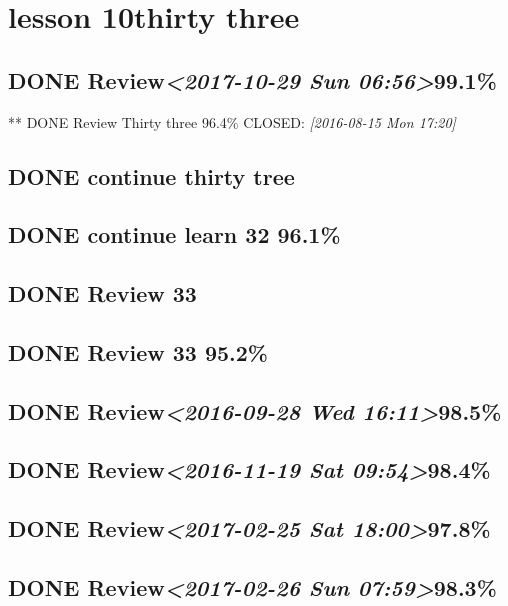 \documentclass[11pt]{ctexart}
\begin{document}
\section{lesson 10thirty three}
\label{sec:orgcbf88a8}
\subsection{{\bfseries\sffamily DONE} Review\textit{<2017-10-29 Sun 06:56>}99.1\%}
\label{sec:org2684000}
** DONE Review Thirty three 96.4\%
CLOSED: \textit{[2016-08-15 Mon 17:20]}

\subsection{{\bfseries\sffamily DONE} continue thirty tree}
\label{sec:orgbc2ec98}

\subsection{{\bfseries\sffamily DONE} continue learn 32 96.1\%}
\label{sec:org8f25441}


\subsection{{\bfseries\sffamily DONE} Review 33}
\label{sec:orged7d79a}
\subsection{{\bfseries\sffamily DONE} Review 33 95.2\%}
\label{sec:org6af00b8}
\subsection{{\bfseries\sffamily DONE} Review\textit{<2016-09-28 Wed 16:11>}98.5\%}
\label{sec:orgf3143e1}
\subsection{{\bfseries\sffamily DONE} Review\textit{<2016-11-19 Sat 09:54>}98.4\%}
\label{sec:orga68663b}
\subsection{{\bfseries\sffamily DONE} Review\textit{<2017-02-25 Sat 18:00>}97.8\%}
\label{sec:org9fb868d}
\subsection{{\bfseries\sffamily DONE} Review\textit{<2017-02-26 Sun 07:59>}98.3\%}
\label{sec:orgf676173}
\end{document}
